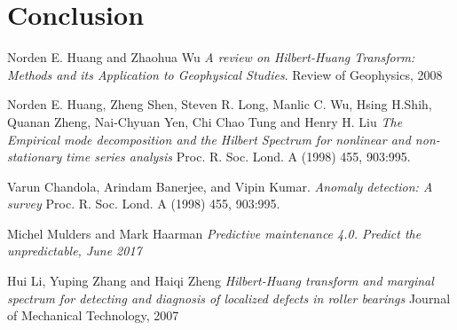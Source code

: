 \documentclass[11pt, oneside]{article}   	%
\begin{document}
\section{Conclusion}
\begin{thebibliography}{9}
Norden E. Huang and Zhaohua Wu 
\textit{A review on Hilbert-Huang Transform: Methods and its Application to Geophysical Studies}. 
Review of Geophysics, 2008
 
Norden E. Huang, Zheng Shen, Steven R. Long, Manlic C. Wu, Hsing H.Shih, Quanan Zheng, Nai-Chyuan Yen, Chi Chao Tung and Henry H. Liu
\textit{The Empirical mode decomposition and the Hilbert Spectrum for nonlinear and non-stationary time series analysis}
Proc. R. Soc. Lond. A (1998) 455, 903:995.

Varun Chandola, Arindam Banerjee, and Vipin Kumar.
\textit{Anomaly detection: A survey}
Proc. R. Soc. Lond. A (1998) 455, 903:995.


 
Michel Mulders and Mark Haarman
\textit{Predictive maintenance 4.0. Predict the unpredictable, June 2017}

 
Hui Li, Yuping Zhang and Haiqi Zheng
\textit{Hilbert-Huang transform and marginal spectrum for detecting and diagnosis of localized defects in roller bearings}
Journal of Mechanical Technology, 2007
\end{thebibliography}
\end{document}
